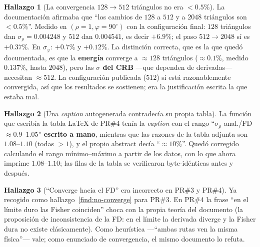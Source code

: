 \documentclass[11pt,a4paper]{article}
\theoremstyle{definition}
\newtheorem{finding}{Hallazgo}
\begin{document}
\begin{finding}[La convergencia $128\to512$ triángulos no era $<0.5\%$]
\label{find:convergencia}
La documentación afirmaba que \enquote{los cambios de $128$ a $512$ y a $2048$
triángulos son $<0.5\%$}. Medido en $(\rho=1,\varphi=90^\circ)$ con la
configuración final: $128$ triángulos dan $\sigma_\rho=0.004248$ y $512$ dan
$0.004541$, es decir \textbf{$+6.9\%$}; el paso $512\to2048$ sí es $+0.37\%$.
En $\sigma_\varphi$: $+0.7\%$ y $+0.12\%$. La distinción correcta, que es la
que quedó documentada, es que la \textbf{energía} converge a $\approx128$
triángulos ($\approx0.1\%$, medido $0.137\%$, hasta $2048$), pero las
\textbf{$\sigma$ del CRB} ---que dependen de derivadas--- necesitan $\approx512$.
La configuración publicada ($512$) sí está razonablemente convergida, así que
los resultados se sostienen; era la justificación escrita la que estaba mal.
\end{finding}

\begin{finding}[Una \emph{caption} autogenerada contradecía su propia tabla]
\label{find:caption}
La función que escribía la tabla LaTeX de PR\#4 tenía la \emph{caption} con el
rango \enquote{$\sigma_\rho$ anal./FD $\approx0.9$--$1.05$} \textbf{escrito a mano},
mientras que las razones de la tabla adjunta son $1.08$--$1.10$ (todas $>1$), y
el propio abstract decía \enquote{$\approx10\%$}. Quedó corregido calculando el rango
mínimo--máximo a partir de los datos, con lo que ahora imprime $1.08$--$1.10$;
las filas de la tabla se verificaron byte-idénticas antes y después.
\end{finding}

\begin{finding}[\enquote{Converge hacia el FD} era incorrecto en PR\#3 y PR\#4]
Ya recogido como hallazgo~\ref{find:no-converge} para PR\#3. En PR\#4 la frase
\enquote{en el límite duro las Fisher coinciden} choca con la propia teoría del
documento (la proposición de inconsistencia de la FD: en el límite la derivada
diverge y la Fisher dura no existe clásicamente). Como heurística
---\enquote{ambas rutas ven la misma física}--- vale; como enunciado de convergencia, el
mismo documento lo refuta.
\end{finding}
\end{document}
